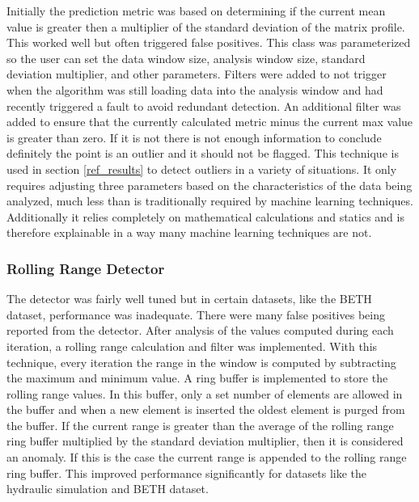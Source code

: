 Initially the prediction metric was based on determining if the current mean value is greater then a multiplier of the standard deviation of the matrix profile. This worked well but often triggered false positives. This class was parameterized so the user can set the data window size, analysis window size, standard deviation multiplier, and other parameters. Filters were added to not trigger when the algorithm was still loading data into the analysis window and had recently triggered a fault to avoid redundant detection. An additional filter was added to ensure that the currently calculated metric minus the current max value is greater than zero. If it is not there is not enough information to conclude definitely the point is an outlier and it should not be flagged. This technique is used in section \ref{ref_results} to detect outliers in a variety of situations. It only requires adjusting three parameters based on the characteristics of the data being analyzed, much less than is traditionally required by machine learning techniques. Additionally it relies completely on mathematical calculations and statics and is therefore explainable in a way many machine learning techniques are not. 

\subsubsection{Rolling Range Detector}

The detector was fairly well tuned but in certain datasets, like the BETH dataset, performance was inadequate. There were many false positives being reported from the detector. After analysis of the values computed during each iteration,
a rolling range calculation and filter was implemented. With this technique, every iteration the range in the window is computed by subtracting the maximum and minimum value. A ring buffer is implemented to store the rolling range values. In this buffer, only a set number of elements are allowed in the buffer and when a new element is inserted the oldest element is purged from the buffer. If the current range is greater than the average of the rolling range ring buffer multiplied by the standard deviation multiplier, then it is considered an anomaly. If this is the case the current range is appended to the rolling range ring buffer. This improved performance significantly for datasets like the hydraulic simulation and BETH dataset.